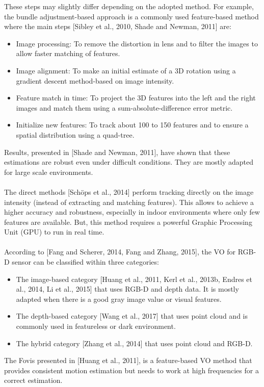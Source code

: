 These steps may slightly differ depending on the adopted method. For example, the bundle adjustment-based approach is a commonly used feature-based method where the main steps [Sibley et al., 2010, Shade and Newman, 2011] are:
\begin{itemize}
    \item Image processing: To remove the distortion in lens and to filter the images to allow faster matching of features.
    \item Image alignment: To make an initial estimate of a 3D rotation using a gradient descent method-based on image intensity.
    \item Feature match in time: To project the 3D features into the left and the right images and match them using a sum-absolute-difference error metric.
    \item Initialize new features: To track about 100 to 150 features and to ensure a spatial distribution using a quad-tree.
\end{itemize}
Results, presented in [Shade and Newman, 2011], have shown that these estimations are robust even under diﬃcult conditions. They are mostly adapted for large scale environments.\\ \\
The direct methods [Schöps et al., 2014] perform tracking directly on the image intensity
(instead of extracting and matching features). This allows to achieve a higher accuracy
and robustness, especially in indoor environments where only few features are available.
But, this method requires a powerful Graphic Processing Unit (GPU) to run in real time.\\\\
According to [Fang and Scherer, 2014, Fang and Zhang, 2015], the VO for RGB-D sensor
can be classiﬁed within three categories:
\begin{itemize}
    \item The image-based category [Huang et al., 2011, Kerl et al., 2013b, Endres et al., 2014, Li et al., 2015] that uses RGB-D and depth data. It is mostly adapted when there is a good gray image value or visual features.
    \item The depth-based category [Wang et al., 2017] that uses point cloud and is commonly used in featureless or dark environment.
    \item The hybrid category [Zhang et al., 2014] that uses point cloud and RGB-D.
\end{itemize}
The Fovis presented in [Huang et al., 2011], is a feature-based VO method that provides consistent motion estimation but needs to work at high frequencies for a correct estimation.\\\\
